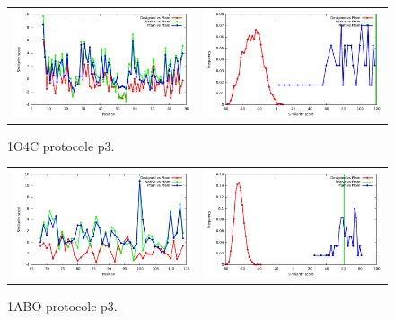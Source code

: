 \documentclass[a4paper,12pt]{article}
\begin{document}
   \begin{figure}[t]
     \centering
     \begin{tabular}{cc}
       \includegraphics[width=8.45cm]{gen_08032012/1O4C/p3/similarity_bypos.pdf} &
       \includegraphics[width=8.45cm]{gen_08032012/1O4C/p3/similarity_byseq_frequency.pdf} \\
     \end{tabular}
     
     \caption{1O4C protocole p3.}
     \label{1ABO}
   \end{figure}
   \begin{figure}[t]
     \centering
     \begin{tabular}{cc}
       \includegraphics[width=8.45cm]{gen_08032012/1ABO/p3/similarity_bypos.pdf} &
       \includegraphics[width=8.45cm]{gen_08032012/1ABO/p3/similarity_byseq_frequency.pdf} \\
     \end{tabular}
     
     \caption{1ABO protocole p3.}
     \label{1ABO}
   \end{figure}
\end{document}
